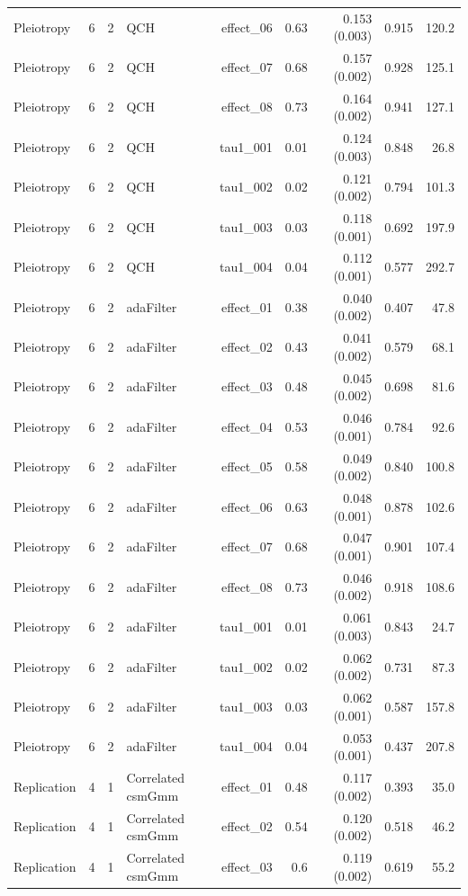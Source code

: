 \begin{longtable}{lcclrrrrr}
Pleiotropy & 6 & 2 & QCH & effect\_06 & 0.63 & 0.153 (0.003) & 0.915 & 120.2\\
Pleiotropy & 6 & 2 & QCH & effect\_07 & 0.68 & 0.157 (0.002) & 0.928 & 125.1\\
Pleiotropy & 6 & 2 & QCH & effect\_08 & 0.73 & 0.164 (0.002) & 0.941 & 127.1\\
Pleiotropy & 6 & 2 & QCH & tau1\_001 & 0.01 & 0.124 (0.003) & 0.848 & 26.8\\
Pleiotropy & 6 & 2 & QCH & tau1\_002 & 0.02 & 0.121 (0.002) & 0.794 & 101.3\\
Pleiotropy & 6 & 2 & QCH & tau1\_003 & 0.03 & 0.118 (0.001) & 0.692 & 197.9\\
Pleiotropy & 6 & 2 & QCH & tau1\_004 & 0.04 & 0.112 (0.001) & 0.577 & 292.7\\
Pleiotropy & 6 & 2 & adaFilter & effect\_01 & 0.38 & 0.040 (0.002) & 0.407 & 47.8\\
Pleiotropy & 6 & 2 & adaFilter & effect\_02 & 0.43 & 0.041 (0.002) & 0.579 & 68.1\\
Pleiotropy & 6 & 2 & adaFilter & effect\_03 & 0.48 & 0.045 (0.002) & 0.698 & 81.6\\
Pleiotropy & 6 & 2 & adaFilter & effect\_04 & 0.53 & 0.046 (0.001) & 0.784 & 92.6\\
Pleiotropy & 6 & 2 & adaFilter & effect\_05 & 0.58 & 0.049 (0.002) & 0.840 & 100.8\\
Pleiotropy & 6 & 2 & adaFilter & effect\_06 & 0.63 & 0.048 (0.001) & 0.878 & 102.6\\
Pleiotropy & 6 & 2 & adaFilter & effect\_07 & 0.68 & 0.047 (0.001) & 0.901 & 107.4\\
Pleiotropy & 6 & 2 & adaFilter & effect\_08 & 0.73 & 0.046 (0.002) & 0.918 & 108.6\\
Pleiotropy & 6 & 2 & adaFilter & tau1\_001 & 0.01 & 0.061 (0.003) & 0.843 & 24.7\\
Pleiotropy & 6 & 2 & adaFilter & tau1\_002 & 0.02 & 0.062 (0.002) & 0.731 & 87.3\\
Pleiotropy & 6 & 2 & adaFilter & tau1\_003 & 0.03 & 0.062 (0.001) & 0.587 & 157.8\\
Pleiotropy & 6 & 2 & adaFilter & tau1\_004 & 0.04 & 0.053 (0.001) & 0.437 & 207.8\\
Replication & 4 & 1 & Correlated csmGmm & effect\_01 & 0.48 & 0.117 (0.002) & 0.393 & 35.0\\
Replication & 4 & 1 & Correlated csmGmm & effect\_02 & 0.54 & 0.120 (0.002) & 0.518 & 46.2\\
Replication & 4 & 1 & Correlated csmGmm & effect\_03 & 0.6 & 0.119 (0.002) & 0.619 & 55.2\\

\end{longtable}
